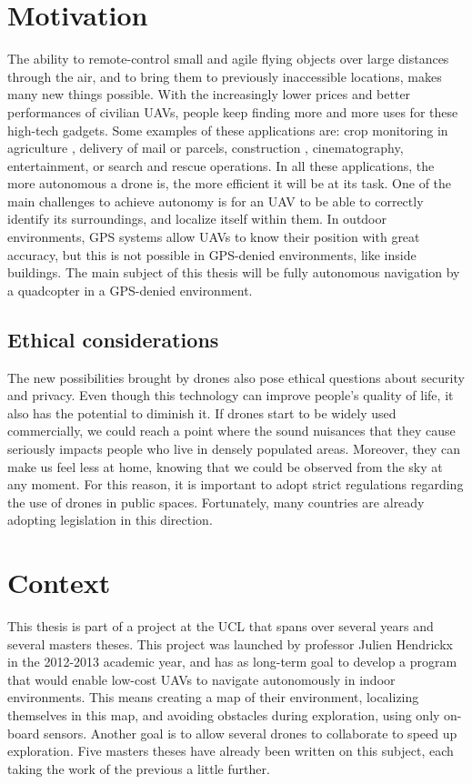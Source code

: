 \section{Motivation}
The ability to remote-control small and agile flying objects over large distances through the air, and to bring them to previously inaccessible locations, makes many new things possible. With the increasingly lower prices and better performances of civilian UAVs, people keep finding more and more uses for these high-tech gadgets. Some examples of these applications are: crop monitoring in agriculture \cite{agriculturaldrones}, delivery of mail or parcels, construction \cite{batiravecdesdrones}, cinematography, entertainment, or search and rescue operations. In all these applications, the more autonomous a drone is, the more efficient it will be at its task. One of the main challenges to achieve autonomy is for an UAV to be able to correctly identify its surroundings, and localize itself within them. In outdoor environments, GPS systems allow UAVs to know their position with great accuracy, but this is not possible in GPS-denied environments, like inside buildings. The main subject of this thesis will be fully autonomous navigation by a quadcopter in a GPS-denied environment.

\subsection{Ethical considerations}
The new possibilities brought by drones also pose ethical questions about security and privacy. Even though this technology can improve people's quality of life, it also has the potential to diminish it. If drones start to be widely used commercially, we could reach a point where the sound nuisances that they cause seriously impacts people who live in densely populated areas. Moreover, they can make us feel less at home, knowing that we could be observed from the sky at any moment. For this reason, it is important to adopt strict regulations regarding the use of drones in public spaces. Fortunately, many countries are already adopting legislation in this direction.


\section{Context}
This thesis is part of a project at the UCL that spans over several years and several masters theses. This project was launched by professor Julien Hendrickx in the 2012-2013 academic year, and has as long-term goal to develop a program that would enable low-cost UAVs to navigate autonomously in indoor environments. This means creating a map of their environment, localizing themselves in this map, and avoiding obstacles during exploration, using only on-board sensors. Another goal is to allow several drones to collaborate to speed up exploration. Five masters theses have already been written on this subject, each taking the work of the previous a little further.

